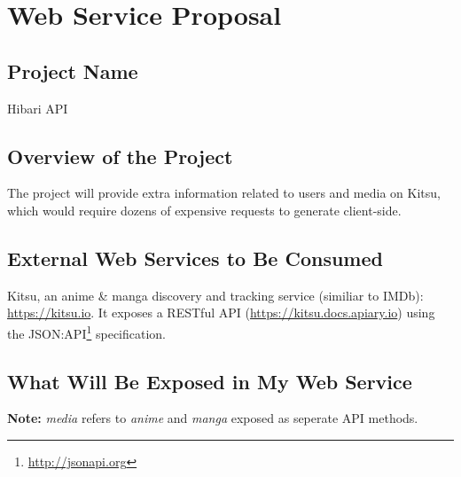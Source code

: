 \section{Web Service Proposal}
\subsection{Project Name}

Hibari API

\subsection{Overview of the Project}

The project will provide extra information  related to users and media on Kitsu, which would require dozens of expensive requests to generate client-side.

\subsection{External Web Services to Be Consumed}

Kitsu, an anime \& manga discovery and tracking service (similiar to IMDb): \url{https://kitsu.io}. It exposes a RESTful API (\url{https://kitsu.docs.apiary.io}) using the JSON:API\footnote{\url{http://jsonapi.org}} specification.

\subsection{What Will Be Exposed in My Web Service}


\textbf{Note:} \textit{media} refers to \textit{anime} and \textit{manga} exposed as seperate API methods.

